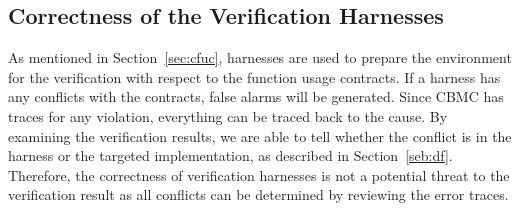 \subsection{Correctness of the Verification Harnesses}
As mentioned in Section~\ref{sec:cfuc}, harnesses are used to prepare the environment for the verification with respect to the function usage contracts. If a harness has any conflicts with the contracts, false alarms will be generated. Since CBMC has traces for any violation, everything can be traced back to the cause. By examining the verification results, we are able to tell whether the conflict is in the harness or the targeted implementation, as described in Section~\ref{seb:df}. Therefore, the correctness of verification harnesses is not a potential threat to the verification result as all conflicts can be determined by reviewing the error traces.




